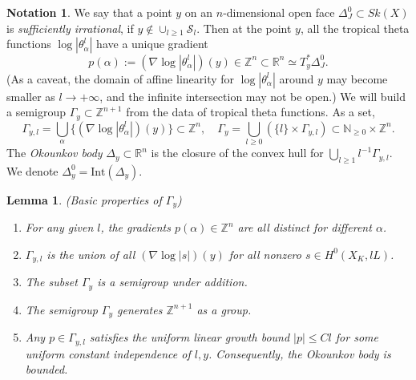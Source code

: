 \documentclass[a4paper]{article}
\newtheorem{lem}[thm]{Lemma}
\theoremstyle{definition}
\newtheorem*{Notation}{Notation}
\newcommand{\R}{\mathbb{R}}
\newcommand{\Z}{\mathbb{Z}}
\newcommand{\N}{\mathbb{N}}
\begin{document}
\begin{Notation}
	We say that a point $y$ on an $n$-dimensional open face $\Delta_J^0\subset Sk(X)$ is \emph{sufficiently irrational}, if $y\notin \cup_{l\geq 1} \mathcal{S}_l$. Then at the point $y$, all the tropical theta functions $\log |\theta_\alpha^l |$ have a unique gradient 
	\begin{equation}
		p(\alpha):= (\nabla \log |\theta_\alpha^l|)(y) \in \Z^n\subset   \R^n\simeq T_y^* \Delta_J^0.
	\end{equation}
	(As a caveat, the domain of affine linearity for $\log |\theta_\alpha^l|$ around $y$ may become smaller as $l\to +\infty$, and the infinite intersection may not be open.) We will build a semigroup $\Gamma_y\subset \Z^{n+1}$ from the data of tropical theta functions. As a set,
	\begin{equation}
	\Gamma_{y,l}= \bigcup_\alpha \{     (\nabla \log |\theta_\alpha^l|)(y)              \}\subset \Z^n, \quad \Gamma_y= \bigcup_{l\geq 0}  (\{  l             \}\times \Gamma_{y,l} ) \subset \N_{\geq 0}\times \Z^n.
	\end{equation}
	The \emph{Okounkov body} $\Delta_y\subset \R^n$ is the closure of the convex hull for $\bigcup_{l\geq 1}  l^{-1} \Gamma_{y,l}$. 
	We denote $\Delta_y^0=\text{Int}(\Delta_y)$. 
\end{Notation}










\begin{lem}  (Basic properties of $\Gamma_y$)\label{lem:Gammay}
\begin{enumerate}
	\item 	For any given $l$,	the gradients $p(\alpha)\in \Z^n$ are all distinct for different $\alpha$.
	

	
	
	\item   $\Gamma_{y,l}$ is the union of all $(\nabla \log |s| )(y)$ for all nonzero $s\in H^0(X_K, lL)$. 
	
	
	
	\item     The subset $\Gamma_y$ is a \emph{semigroup} under addition.
	
	
	\item   The semigroup $\Gamma_y$ generates $\Z^{n+1}$ as a group. 
	
	
	\item  Any $p\in \Gamma_{y,l}$ satisfies the uniform linear growth bound $|p|\leq Cl$ for some uniform constant independence of $l,y$. Consequently, the Okounkov body is bounded.
\end{enumerate}
\end{lem}
\end{document}
